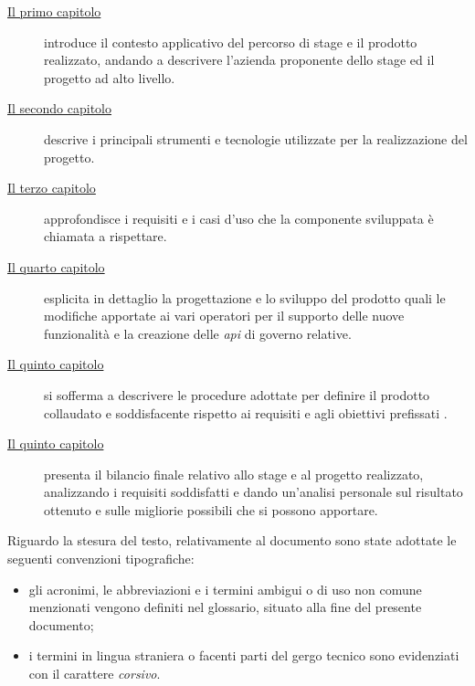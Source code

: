 \begin{description}
	\item[{\hyperref[cap:introduzione]{Il primo capitolo}}] introduce il contesto applicativo del percorso di stage e il prodotto realizzato, andando a descrivere l'azienda proponente dello stage ed il progetto ad alto livello.
 
    \item[{\hyperref[cap:strumenti-tecnologie]{Il secondo capitolo}}] descrive i principali strumenti e tecnologie utilizzate per la realizzazione del progetto.
    
    \item[{\hyperref[cap:analisi-requisiti]{Il terzo capitolo}}] approfondisce i requisiti e i casi d'uso che la componente sviluppata è chiamata a rispettare.
    
    \item[{\hyperref[cap:progettazione-codifica]{Il quarto capitolo}}] esplicita in dettaglio la progettazione e lo sviluppo del prodotto quali le modifiche apportate ai vari operatori per il supporto delle nuove funzionalità e la creazione delle \textit{\gls{api}} di governo relative.
    
    \item[{\hyperref[cap:verifica-validazione]{Il quinto capitolo}}] si sofferma a descrivere le procedure adottate per definire il prodotto collaudato e soddisfacente rispetto ai requisiti e agli obiettivi prefissati .
    
    \item[{\hyperref[cap:conclusioni]{Il quinto capitolo}}] presenta il bilancio finale relativo allo stage e al progetto realizzato, analizzando i requisiti soddisfatti e dando un'analisi personale sul risultato ottenuto e sulle migliorie possibili che si possono apportare.
\end{description}

Riguardo la stesura del testo, relativamente al documento sono state adottate le seguenti convenzioni tipografiche:
\begin{itemize}
	\item gli acronimi, le abbreviazioni e i termini ambigui o di uso non comune menzionati vengono definiti nel glossario, situato alla fine del presente documento;
	\item i termini in lingua straniera o facenti parti del gergo tecnico sono evidenziati con il carattere \emph{corsivo}.
\end{itemize}